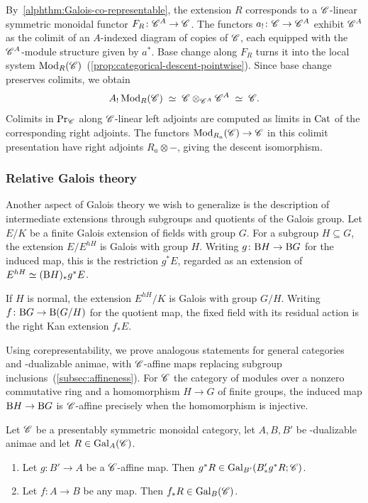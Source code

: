 \documentclass[english,svgnames,table]{article}
\begin{document}
    By~\cref{alphthm:Galois-co-representable}, the extension $R$ corresponds to a $\mathscr{C}$-linear symmetric monoidal functor $F_R \colon \mathscr{C}^A \to \mathscr{C}$.
    The functors $a_! \colon \mathscr{C} \to \mathscr{C}^A$ exhibit $\mathscr{C}^A$ as the colimit of an $A$-indexed diagram of copies of $\mathscr{C}$, each equipped with the $\mathscr{C}^A$-module structure given by $a^*$.
    Base change along $F_R$ turns it into the local system $\operatorname{Mod}_R(\mathscr{C})$~(\cref{prop:categorical-descent-pointwise}).
    Since base change preserves colimits, we obtain
    \begin{equation*}
        A_!\operatorname{Mod}_R(\mathscr{C}) \;\simeq\; \mathscr{C} \otimes_{\mathscr{C}^A} \mathscr{C}^A \;\simeq\; \mathscr{C}.
    \end{equation*}
    Colimits in $\operatorname{Pr}_{\mathscr{C}}$ along $\mathscr{C}$-linear left adjoints are computed as limits in $\mathrm{Cat}$ of the corresponding right adjoints. 
    The functors $\operatorname{Mod}_{R_a}(\mathscr{C}) \to \mathscr{C}$ in this colimit presentation have right adjoints $R_a \otimes -$, giving the descent isomorphism.

    \subsubsection*{Relative Galois theory}

    Another aspect of Galois theory we wish to generalize is the description of intermediate extensions through subgroups and quotients of the Galois group.
    Let $E/K$ be a finite Galois extension of fields with group $G$.
    For a subgroup $H \subseteq G$, the extension $E/E^{hH}$ is Galois with group $H$.
    Writing $g \colon \mathrm{B} H \to \mathrm{B} G$ for the induced map, this is the restriction $g^*E$, regarded as an extension of $E^{hH} \simeq (\mathrm{B} H)_*g^*E$.

    If $H$ is normal, the extension $E^{hH}/K$ is Galois with group $G/H$.
    Writing $f \colon \mathrm{B} G \to \mathrm{B}(G/H)$ for the quotient map, the fixed field with its residual action is the right Kan extension $f_*E$.

    Using corepresentability, we prove analogous statements for general categories and \CO-dualizable animae, with $\mathscr{C}$-affine maps replacing subgroup inclusions~(\cref{subsec:affineness}).
    For $\mathscr{C}$ the category of modules over a nonzero commutative ring and a homomorphism $H \to G$ of finite groups, the induced map $\mathrm{B} H \to \mathrm{B} G$ is $\mathscr{C}$-affine precisely when the homomorphism is injective.

    \begin{proposition}
    \label{prop:intro-relative-Galois}
        Let $\mathscr{C}$ be a presentably symmetric monoidal category, let $A,B,B'$ be \CO-dualizable animae and let $R \in \mathrm{Gal}_A(\mathscr{C})$.
        \begin{enumerate}
            \item Let $g \colon B' \to A$ be a $\mathscr{C}$-affine map.
            Then $g^*R \in \mathrm{Gal}_{B'}(B'_*g^*R;\mathscr{C})$.
            \item Let $f \colon A \to B$ be any map.
            Then $f_*R \in \mathrm{Gal}_B(\mathscr{C})$.
        \end{enumerate}
    \end{proposition}
    
\end{document}
